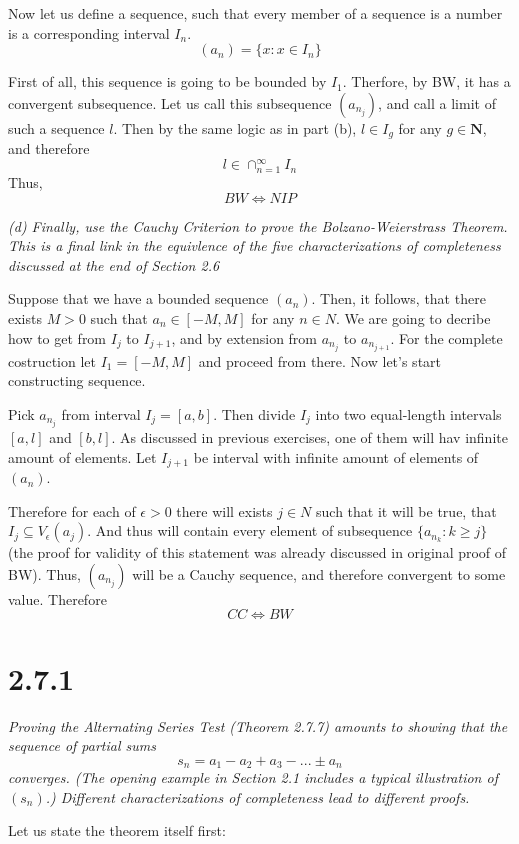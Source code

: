\documentclass[11pt,oneside,titlepage]{book}
\begin{document}
Now let us define a sequence, such that every member of a sequence is
a number is a corresponding interval $I_n$.
$$(a_n) = \{x: x \in I_n\}$$

First of all, this sequence is going to be bounded by $I_1$. Therfore, by
BW, it has a convergent subsequence. Let us call this subsequence $(a_{n_j})$,
and call a limit of such a sequence $l$. Then by the same logic as in part (b),
$l \in I_g$ for any $g \in \textbf{N}$, and therefore
$$l \in \cap_{n = 1}^{\infty}I_n$$
Thus,
$$BW \iff NIP$$

\textit{(d) Finally, use the Cauchy Criterion to prove the Bolzano-Weierstrass
  Theorem. This is a final link in the equivlence of the five characterizations
  of completeness discussed at the end of Section 2.6}

Suppose that we have a bounded sequence $(a_n)$. Then, it follows, that
there exists $M > 0$ such that $a_n \in [-M, M]$ for any $n \in N$.
We are going to decribe how to get from $I_j$ to $I_{j + 1}$, and
by extension from $a_{n_j}$ to $a_{n_{j + 1}}$. For the complete costruction
let $I_1 = [-M, M]$ and proceed from there.
Now let's start constructing sequence.

Pick $a_{n_{j}} $ from interval $I_j = [a, b]$. Then divide $I_j$ into two
equal-length intervals $[a, l]$ and $[b, l]$. As discussed in previous
exercises, one of them will hav infinite amount of elements. Let $I_{j + 1}$
be interval with infinite amount of elements of $(a_n)$.

Therefore for each of $\epsilon > 0$ there will exists $j \in N$ such that
it will be true, that $I_j \subseteq V_\epsilon(a_j)$. And thus will contain
every  element of subsequence $\{a_{n_k}: k \geq j\}$ (the proof for validity
of this statement was already discussed in original proof of BW). Thus,
$(a_{n_j})$ will be a Cauchy sequence, and therefore convergent to some
value. Therefore
$$CC \iff BW$$

\section*{2.7.1}
\textit{Proving the Alternating Series Test (Theorem 2.7.7) amounts to
  showing that the sequence of partial sums }
$$s_n  = a_1 - a_2 + a_3 - ... \pm a_n$$
\textit{converges. (The opening example in Section 2.1 includes a
  typical illustration of $(s_n)$.) Different characterizations of
  completeness lead to different proofs.}

Let us state the theorem itself first:
\end{document}
